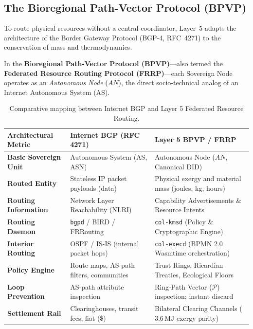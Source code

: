 \subsection{The Bioregional Path-Vector Protocol (BPVP)}

To route physical resources without a central coordinator, Layer~5 adapts the architecture of the Border Gateway Protocol (BGP-4, RFC~4271) \parencite{rekhter2006} to the conservation of mass and thermodynamics.

In the \textbf{Bioregional Path-Vector Protocol (BPVP)}—also termed the \textbf{Federated Resource Routing Protocol (FRRP)}—each Sovereign Node operates as an \textit{Autonomous Node} ($AN$), the direct socio-technical analog of an Internet Autonomous System (AS).

\begin{table}[htbp]
\centering
\small
\setlength{\tabcolsep}{4pt}
\begin{tabular}{|p{}|p{}|p{}|}
\hline
\textbf{Architectural Metric} & \textbf{Internet BGP (RFC 4271)} & \textbf{Layer 5 BPVP / FRRP} \\
\hline
\textbf{Basic Sovereign Unit} & Autonomous System (AS, ASN) & Autonomous Node ($AN$, Canonical DID) \\
\hline
\textbf{Routed Entity} & Stateless IP packet payloads (data) & Physical exergy and material mass (joules, kg, hours) \\
\hline
\textbf{Routing Information} & Network Layer Reachability (NLRI) & Capability Advertisements \& Resource Intents \\
\hline
\textbf{Routing Daemon} & \texttt{bgpd} / BIRD / FRRouting & \texttt{col-kmsd} (Policy \& Cryptographic Engine) \\
\hline
\textbf{Interior Routing} & OSPF / IS-IS (internal packet hops) & \texttt{col-execd} (BPMN 2.0 Wasmtime orchestration) \\
\hline
\textbf{Policy Engine} & Route maps, AS-path filters, communities & Trust Rings, Ricardian Treaties, Ecological Floors \\
\hline
\textbf{Loop Prevention} & AS-path attribute inspection & Ring-Path Vector ($\mathcal{P}$) inspection; instant discard \\
\hline
\textbf{Settlement Rail} & Clearinghouses, transit fees, fiat (\$) & Bilateral Clearing Channels ($3.6\,\mathrm{MJ}$ exergy parity) \\
\hline
\end{tabular}
\caption{Comparative mapping between Internet BGP and Layer 5 Federated Resource Routing.}
\label{tab:bgp_comparison}
\end{table}

